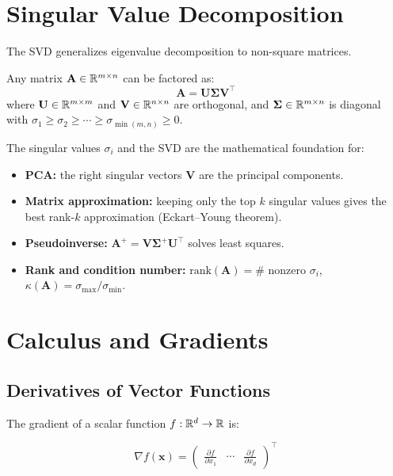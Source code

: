 \section{Singular Value Decomposition}

The SVD generalizes eigenvalue decomposition to non-square matrices.

\begin{definition}[SVD]
	Any matrix $\mathbf{A} \in \mathbb{R}^{m \times n}$ can be factored as:
	\[
		\mathbf{A} = \mathbf{U} \boldsymbol{\Sigma} \mathbf{V}^\top
	\]
	where $\mathbf{U} \in \mathbb{R}^{m \times m}$ and $\mathbf{V} \in \mathbb{R}^{n \times n}$ are orthogonal, and $\boldsymbol{\Sigma} \in \mathbb{R}^{m \times n}$ is diagonal with $\sigma_1 \geq \sigma_2 \geq \cdots \geq \sigma_{\min(m,n)} \geq 0$.
\end{definition}

The singular values $\sigma_i$ and the SVD are the mathematical foundation for:

\begin{itemize}
	\item \textbf{PCA:} the right singular vectors $\mathbf{V}$ are the principal components.
	\item \textbf{Matrix approximation:} keeping only the top $k$ singular values gives the best rank-$k$ approximation (Eckart--Young theorem).
	\item \textbf{Pseudoinverse:} $\mathbf{A}^+ = \mathbf{V} \boldsymbol{\Sigma}^+ \mathbf{U}^\top$ solves least squares.
	\item \textbf{Rank and condition number:} $\text{rank}(\mathbf{A}) = \# \text{ nonzero } \sigma_i$, $\kappa(\mathbf{A}) = \sigma_{\max} / \sigma_{\min}$.
\end{itemize}

\section{Calculus and Gradients}

\subsection{Derivatives of Vector Functions}

The gradient of a scalar function $f: \mathbb{R}^d \to \mathbb{R}$ is:

\[
	\nabla f(\mathbf{x}) = \begin{pmatrix}
		\frac{\partial f}{\partial x_1} & \cdots & \frac{\partial f}{\partial x_d}
	\end{pmatrix}^\top
\]

